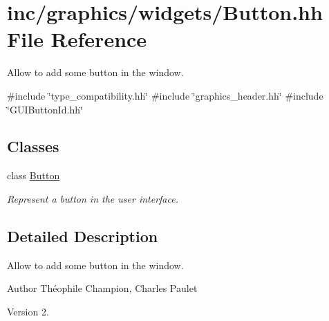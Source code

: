\hypertarget{Button_8hh}{}\section{inc/graphics/widgets/\+Button.hh File Reference}
\label{Button_8hh}


Allow to add some button in the window.  


{\ttfamily \#include \char`\"{}type\+\_\+compatibility.\+hh\char`\"{}}\newline
{\ttfamily \#include \char`\"{}graphics\+\_\+header.\+hh\char`\"{}}\newline
{\ttfamily \#include \char`\"{}G\+U\+I\+Button\+Id.\+hh\char`\"{}}\newline
\subsection*{Classes}
\begin{DoxyCompactItemize}
\item 
class \hyperlink{classButton}{Button}
\begin{DoxyCompactList}\small\item\em Represent a button in the user interface. \end{DoxyCompactList}\end{DoxyCompactItemize}


\subsection{Detailed Description}
Allow to add some button in the window. 

\begin{DoxyAuthor}{Author}
Théophile Champion, Charles Paulet 
\end{DoxyAuthor}
\begin{DoxyVersion}{Version}
2. 
\end{DoxyVersion}
